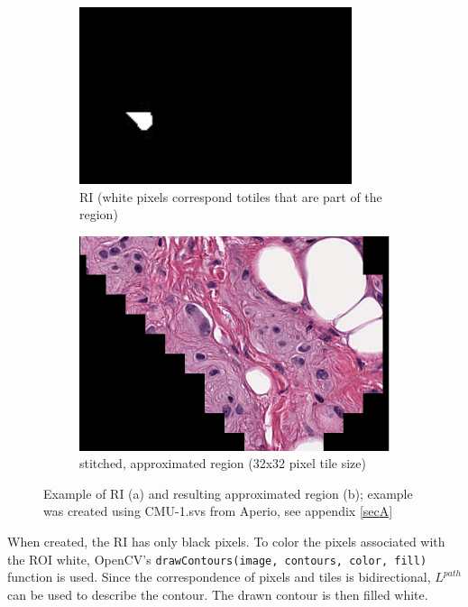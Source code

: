 \begin{figure}[H]
	\begin{subfigure}{.5\textwidth}
		\centering
		\includegraphics[width=.8\linewidth]{img/RI_a.png}
		\caption{RI (white pixels correspond to\newline tiles that are part of the region)}
		\label{fig5_riA}
	\end{subfigure}%
	\begin{subfigure}{.5\textwidth}
		\centering
		\includegraphics[width=.8\linewidth]{img/RI_b.png}
		\caption{stitched, approximated region (32x32 pixel tile size) }
		\label{fig5_riB}
	\end{subfigure}
	\caption{Example of RI (a) and resulting approximated region (b); example was created using CMU-1.svs from Aperio, see appendix \ref{secA}}
	\label{fig5_riExample}
\end{figure}

When created, the RI has only black pixels. To color the pixels associated with the ROI white,  OpenCV's \texttt{drawContours(image, contours, color, fill)} function is used. Since the correspondence of pixels and tiles is bidirectional, $L^{path}$ can be used to describe the contour. The drawn contour is then filled white.

